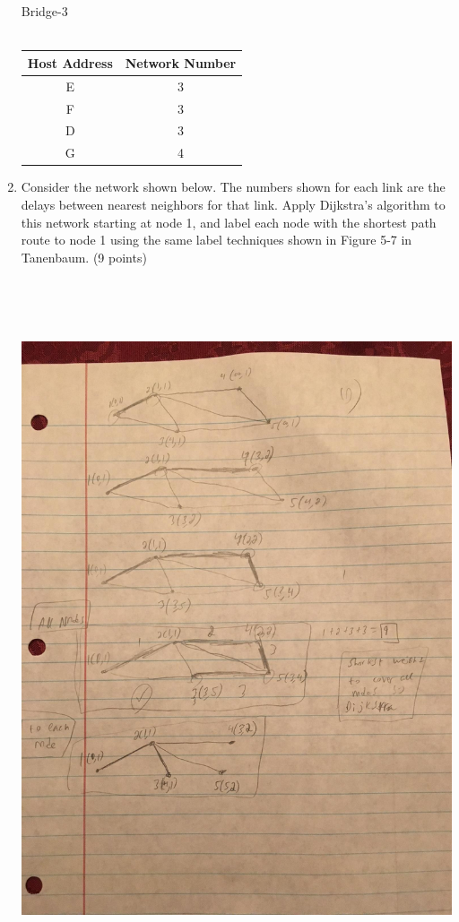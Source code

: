 \documentclass[12pt]{article}
\begin{document}
\begin{enumerate}
\begin{center}
  ~\\ ~\\ Bridge-3 \\ ~\\
  \begin{tabular}{|c|c|}
    \hline
    Host Address & Network Number \\
    \hline
    E & 3 \\
    \hline
    F & 3 \\
    \hline
    D & 3 \\
    \hline
    G & 4 \\
    \hline
  \end{tabular} 
\end{center}

\newpage

\item Consider the network shown below.  The numbers shown for each link are the delays between nearest neighbors for that link.  Apply Dijkstra’s algorithm to this network starting at node 1, and label each node with the shortest path route to node 1 using the same label techniques shown in Figure 5-7 in Tanenbaum. (9 points) \\ \\
\includegraphics[width=6in, height=8in]{IMG_0194}


\end{enumerate}
\end{document}
